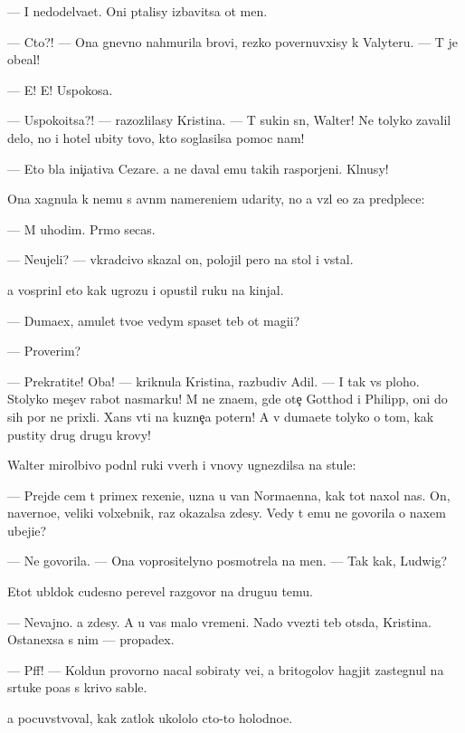 \documentclass[10pt]{book}
\begin{document}
— I nedodel{\yi}va{\y}et. Oni p{\yi}talisy izbavitsa ot men{\ia}.

— Cto?! — Ona gnevno nahmurila brovi, rezko povernuvxisy k Valyteru. — T{\yi} je obe{\x}al!

— E{\y}! E{\y}! Uspoko{\y}sa.

— Uspoko{\y}itsa?! — razozlilasy Kristina. — T{\yi} sukin s{\yi}n, Walter! Ne tolyko zavalil delo, no i hotel ubity tovo, kto soglasilsa pomoc nam!

— Eto b{\yi}la ini{\c}iativa Cezare. {\Y}a ne daval {\y}emu takih raspor{\ia}jeni{\y}. Kl{\ia}nusy!

Ona xagnula k nemu s {\y}avn{\yi}m namereni{\y}em udarity, no {\y}a vz{\ia}l {\y}e{\y}o za predplec{\y}e:

— M{\yi} uhodim. Pr{\ia}mo se{\y}cas.

— Neujeli? — vkradcivo skazal on, polojil pero na stol i vstal.

{\Y}a vosprin{\ia}l eto kak ugrozu i opustil ruku na kinjal.

— Duma{\y}ex, amulet tvo{\y}e{\y} vedym{\yi} spaset teb{\ia} ot magi{\y}i?

— Proverim?

— Prekratite! Oba! — kriknula Kristina, razbudiv Adil{\ia}. — I tak vs{\e} ploho. Stolyko mes{\ia}{\c}ev rabot{\yi} nasmarku! M{\yi} ne zna{\y}em, gde ote{\c} Gotthod i Philipp, oni do sih por ne prixli. Xans v{\yi}{\y}ti na kuzne{\c}a poter{\ia}n! A v{\yi} duma{\y}ete tolyko o tom, kak pustity drug drugu krovy!

Walter mirol{\iu}bivo podn{\ia}l ruki vverh i vnovy ugnezdilsa na stule:

— Prejde cem t{\yi} primex rexeni{\y}e, uzna{\y} u van Norma{\y}enna, kak tot naxol nas. On, naverno{\y}e, veliki{\y} volxebnik, raz okazalsa zdesy. Vedy t{\yi} {\y}emu ne govorila o naxem ubeji{\x}e?

— Ne govorila. — Ona voprositelyno posmotrela na men{\ia}. — Tak kak, Ludwig?

Etot ubl{\iu}dok cudesno perevel razgovor na drugu{\y}u temu.

— Nevajno. {\Y}a zdesy. A u vas malo vremeni. Nado v{\yi}vezti teb{\ia} ots{\iu}da, Kristina. Ostanexsa s nim — propadex.

— Pff! — Koldun provorno nacal sobiraty ve{\x}i, a britogolov{\yi}{\y} hagjit zastegnul na s{\iu}rtuke po{\y}as s krivo{\y} sable{\y}.

{\Y}a pocuvstvoval, kak zat{\yi}lok ukololo cto-to holodno{\y}e.
\end{document}
